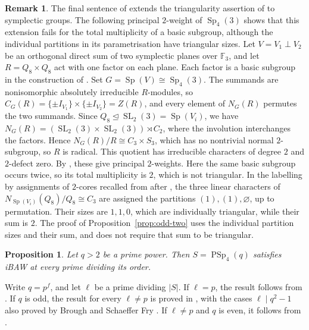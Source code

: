 \documentclass[10pt]{amsart}
\newtheorem{proposition}[theorem]{Proposition}
\theoremstyle{definition}
\newtheorem{remark}[theorem]{Remark}
\let\oldendproof\endproof
\renewenvironment{proof}[1][\proofname]{%
  \oldproof[\bfseries #1]%
}{\oldendproof}
\DeclareMathOperator{\Sp}{Sp}
\DeclareMathOperator{\PSp}{PSp}
\newcommand{\F}{\mathbb F}
\numberwithin{equation}{section}
\numberwithin{table}{section}
\begin{document}
\begin{remark}\label{rem:triangular-multiplicity}
The final sentence of \cite[Remark~3.50]{FengYuZhang2024} extends the
triangularity assertion of \cite[Remark~3.47(2)]{FengYuZhang2024} to
symplectic groups. The following principal $2$-weight of $\Sp_4(3)$ shows that
this extension fails for the total multiplicity of a basic subgroup, although
the individual partitions in its parametrisation have triangular sizes.
Let $V=V_1\perp V_2$ be an orthogonal direct sum of two symplectic
planes over $\F_3$, and let $R=Q_8\times Q_8$ act with one factor
on each plane. Each factor is a basic subgroup in the construction
of \cite[Section~3]{FengYuZhang2024}.
Set $G=\Sp(V)\cong\Sp_4(3)$.
The summands are nonisomorphic absolutely irreducible $R$-modules,
so $C_G(R)=\{\pm I_{V_1}\}\times\{\pm I_{V_2}\}=Z(R)$,
and every element of $N_G(R)$ permutes the two summands.
Since $Q_8\trianglelefteq\operatorname{SL}_2(3)=\Sp(V_i)$, we have
$N_G(R)=(\operatorname{SL}_2(3)\times\operatorname{SL}_2(3))\rtimes C_2$,
where the involution interchanges the factors.
Hence $N_G(R)/R\cong C_3\times S_3$, which has no nontrivial
normal $2$-subgroup, so $R$ is radical.
This quotient has irreducible characters of degree $2$ and
$2$-defect zero.  By \cite[Lemma~2.3]{FengYuZhang2024}, these give
principal $2$-weights.
Here the same basic subgroup occurs twice, so its total multiplicity
is $2$, which is not triangular. In the labelling by assignments of
$2$-cores recalled from \cite[(6D)]{An1993} after
\cite[Proposition~5.4]{FengMalle2022}, the three linear characters of
$N_{\Sp(V_i)}(Q_8)/Q_8\cong C_3$ are assigned the partitions
$(1),(1),\varnothing$, up to permutation.  Their sizes are $1,1,0$, which are individually
triangular, while their sum is $2$. The proof of
Proposition~\ref{prop:odd-two} uses the individual partition sizes and their
sum, and does not require that sum to be triangular.
\end{remark}

\begin{proposition}\label{prop:rank-two}
Let $q>2$ be a prime power.  Then $S=\PSp_4(q)$ satisfies iBAW at every
prime dividing its order.
\end{proposition}

\begin{proof}
Write $q=p^f$, and let $\ell$ be a prime dividing $|S|$.
If $\ell=p$, the result follows from \cite[Theorem~C]{Spath2013}.
If $q$ is odd, the result for every $\ell\neq p$ is proved in
\cite[Theorem~1.1]{LiLi2019}, with the cases $\ell\mid q^2-1$
also proved by Brough and Schaeffer Fry
\cite[Theorem~1.1]{BroughSchaefferFry2020}.
If $\ell\neq p$ and $q$ is even, it follows from
\cite[Theorem~5.5]{SchaefferFry2014}.
\end{proof}
\end{document}

